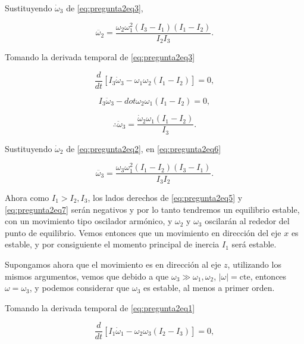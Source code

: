 \documentclass[a4paper,10pt]{article}
\numberwithin{equation}{section}
\begin{document}
Sustituyendo $\dot{\omega}_3$ de \eqref{eq:pregunta2eq3}, 

\begin{equation}
 \ddot{\omega_2} = \frac{\omega_2\omega_1^2(I_3 - I_1)(I_1 - I_2)}{I_2I_3}.
 \label{eq:pregunta2eq5}
\end{equation}

Tomando la derivada temporal de \eqref{eq:pregunta2eq3} 

\begin{equation}
 \frac{d}{dt}\left[I_3\dot{\omega}_3 - \omega_1\omega_2(I_1 - I_2) \right] = 0,
\end{equation}

\begin{equation}
 I_3\ddot{\omega}_3 - dot{\omega}_2\omega_1(I_1 - I_2) = 0,
\end{equation}

\begin{equation}
 \therefore \ddot{\omega}_3 = \frac{\dot{\omega}_2\omega_1(I_1-I_2)}{I_3}.
 \label{eq:pregunta2eq6}
\end{equation}

Sustituyendo $\dot{\omega}_2$ de \eqref{eq:pregunta2eq2}, en \eqref{eq:pregunta2eq6}

\begin{equation}
 \ddot{\omega_3} = \frac{\omega_3\omega_1^2(I_1 - I_2)(I_3 - I_1)}{I_3I_2}.
 \label{eq:pregunta2eq7}
\end{equation}

Ahora como $I_1 > I_2,I_3$, los lados derechos de \eqref{eq:pregunta2eq5} y 
\eqref{eq:pregunta2eq7} serán negativos y por lo tanto tendremos un equilibrio 
estable, con un movimiento tipo oscilador armónico, y $\omega_2$ y $\omega_3$ 
oscilarán al rededor del punto de equilibrio. Vemos entonces que un movimiento 
en dirección del eje $x$ es estable, y por consiguiente el momento principal 
de inercia $I_1$ será estable. 

\vspace{.3cm}

Supongamos ahora que el movimiento es en dirección al eje $z$, utilizando los 
mismos argumentos, vemos que debido a que $\omega_3 \gg \omega_1,\omega_2$, 
$|\omega| = \text{cte}$, entonces $\omega = \omega_3$, y podemos considerar 
que $\omega_3$ es estable, al menos a primer orden. 

Tomando la derivada temporal de \eqref{eq:pregunta2eq1} 

\begin{equation}
 \frac{d}{dt}\left[I_1\dot{\omega}_1 - \omega_2\omega_3(I_2 - I_3) \right] = 0,
\end{equation}
\end{document}
